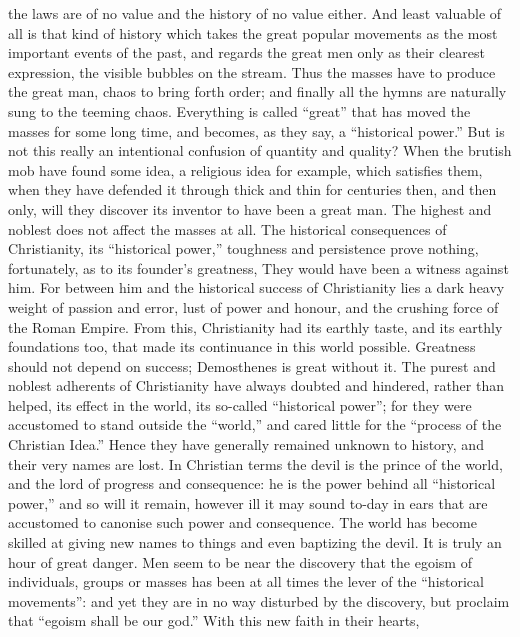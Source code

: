 the laws are of no value and the history of no value either. And
least valuable of all is that kind of history which takes the great
popular movements as the most important events of the past, and
regards the great men only as their clearest expression, the visible
bubbles on the stream. Thus the masses have to produce the great man,
chaos to bring forth order; and finally all the hymns are naturally
sung to the teeming chaos. Everything is called \enquote{great} that has
moved the masses for some long time, and becomes, as they say, a
\enquote{historical power.} But is not this really an intentional confusion
of quantity and quality? When the brutish mob have found some idea, a
religious idea for example, which satisfies them, when they have
defended it through thick and thin for centuries then, and then only,
will they discover its inventor to have been a great man. The highest
and noblest does not affect the masses at all. The historical
consequences of Christianity, its \enquote{historical power,} toughness and
persistence prove nothing, fortunately, as to its founder's
greatness, They would have been a witness against him. For between
him and the historical success of Christianity lies a dark heavy
weight of passion and error, lust of power and honour, and the
crushing force of the Roman Empire. From this, Christianity had its
earthly taste, and its earthly foundations too, that made its
continuance in this world possible. Greatness should not depend on
success; Demosthenes is great without it. The purest and noblest
adherents of Christianity have always doubted and hindered, rather
than helped, its effect in the world, its so-called \enquote{historical
power}; for they were accustomed to stand outside the \enquote{world,} and
cared little for the \enquote{process of the Christian Idea.} Hence they have
generally remained unknown to history, and their very names are lost.
In Christian terms the devil is the prince of the world, and the lord
of progress and consequence: he is the power behind all \enquote{historical
power,} and so will it remain, however ill it may sound to-day in
ears that are accustomed to canonise such power and consequence. The
world has become skilled at giving new names to things and even
baptizing the devil. It is truly an hour of great danger. Men seem to
be near the discovery that the egoism of individuals, groups or
masses has been at all times the lever of the \enquote{historical movements}:
and yet they are in no way disturbed by the discovery, but proclaim
that \enquote{egoism shall be our god.} With this new faith in their hearts,
